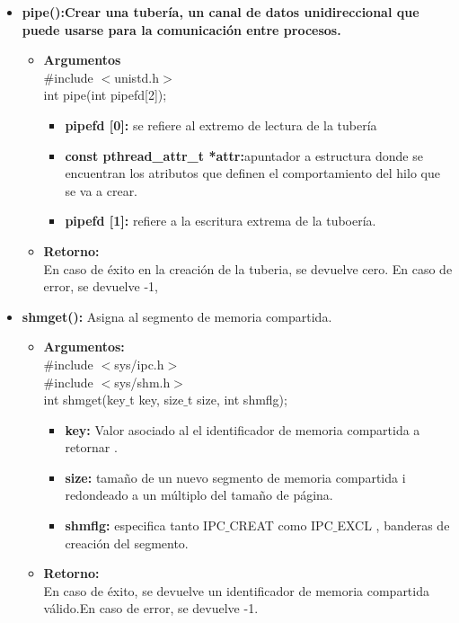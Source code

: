\documentclass[12pt]{article}
\begin{document}
\begin{enumerate}
    \begin{itemize}
            \item \textbf{pipe():Crear una tubería, un canal de datos unidireccional que puede usarse para la comunicación entre procesos.}
            \begin{itemize}
                \item \textbf{Argumentos}\\
                 #include $<$unistd.h$>$\\
                 int pipe(int pipefd[2]);\\
                \begin{itemize}
                El arreglo pipefd se utiliza para devolver dos descriptores de archivo referentes a los extremos de la tubería.
                    \item \textbf{pipefd [0]:} se refiere al extremo de lectura de la tubería
                    \item \textbf{const pthread\_attr\_t *attr:}apuntador a estructura donde se encuentran los atributos que definen el comportamiento del hilo que se va a crear.
                    \item \textbf{pipefd [1]:}  refiere a la escritura extrema de la tuboería.
                \end{itemize}
                \item \textbf{Retorno:} \\
               En caso de éxito en la creación de la tuberia, se devuelve cero. En caso de error, se devuelve -1, 
            \end{itemize}
            \newpage
            \item \textbf{shmget():} Asigna al segmento de memoria compartida.\\
            \begin{itemize}
                \item \textbf{Argumentos:}\\
               #include $<$sys/ipc.h$>$\\
               #include $<$sys/shm.h$>$\\
               int shmget(key$\_$t key, size$\_$t size, int shmflg);\\
                \begin{itemize}
                    \item \textbf{key:} Valor asociado al el identificador de memoria compartida a retornar .
                    \item \textbf{size:} tamaño de un nuevo segmento de memoria compartida i redondeado a un múltiplo del tamaño de página.
                    \item \textbf{shmflg:} especifica tanto IPC$\_$CREAT como IPC$\_$EXCL , banderas de creación del segmento.
                \end{itemize}
                \item \textbf{Retorno:}\\
                En caso de éxito, se devuelve un identificador de memoria compartida válido.En caso de error, se devuelve -1.
            \end{itemize}
            

\end{itemize}
\end{enumerate}
\end{document}
